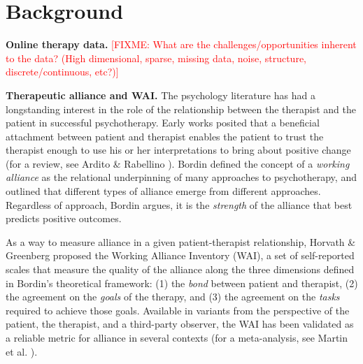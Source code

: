 \documentclass{article}
\newcommand{\fixme}[1]{\textcolor{red}{[FIXME: #1]}}
\begin{document}
\section{Background}
\label{sec:background}


\textbf{Online therapy data.} \fixme{What are the challenges/opportunities inherent to the data? (High dimensional, sparse, missing data, noise, structure, discrete/continuous, etc?)}


\textbf{Therapeutic alliance and WAI.} The psychology literature has had a longstanding interest in the role of the relationship between the therapist and the patient in successful psychotherapy. Early works posited that a beneficial attachment between patient and therapist enables the patient to trust the therapist enough to use his or her interpretations to bring about positive change (for a review, see Ardito \& Rabellino \citeyear{ardito2011therapeutic}). Bordin \citeyear{bordin1979generalizability} defined the concept of a \textit{working alliance} as the relational underpinning of many approaches to psychotherapy, and outlined that different types of alliance emerge from different approaches. Regardless of approach, Bordin argues, it is the \textit{strength} of the alliance that best predicts positive outcomes.

As a way to measure alliance in a given patient-therapist relationship, Horvath \& Greenberg \citeyear{horvath1989development} proposed the Working Alliance Inventory (WAI), a set of self-reported scales that measure the quality of the alliance along the three dimensions defined in Bordin's theoretical framework: (1) the \textit{bond} between patient and therapist, (2) the agreement on the \textit{goals} of the therapy, and (3) the agreement on the \textit{tasks} required to achieve those goals. Available in variants from the perspective of the patient, the therapist, and a third-party observer, the WAI has been validated as a reliable metric for alliance in several contexts (for a meta-analysis, see Martin et al. \citeyear{martin2000relation}).
\end{document}
